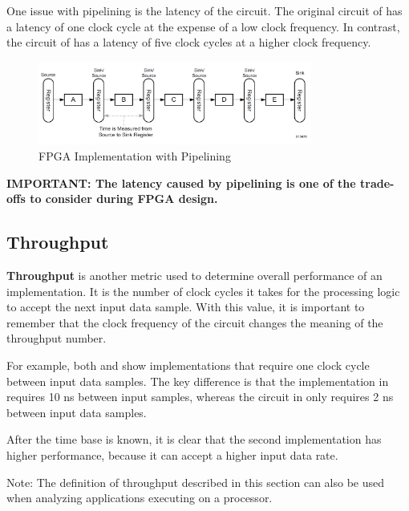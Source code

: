 One issue with pipelining is the latency of the circuit. The original circuit of  has
a latency of one clock cycle at the expense of a low clock frequency. In contrast, the circuit
of  has a latency of five clock cycles at a higher clock frequency.

\begin{figure}[H]
  \begin{center}
      \includegraphics[width=0.8\textwidth]{images/FPGAwithPipe.png}
      \caption{FPGA Implementation with Pipelining}
      \label{FPGAwithPipe}
  \end{center}
\end{figure}

\begin{highlight}
  \textbf{IMPORTANT: The latency caused by pipelining is one of the trade-offs to consider during FPGA design.}
\end{highlight}
\clearpage


\subsection{Throughput}
\textbf{Throughput} is another metric used to determine overall performance of an implementation. It is the number of clock cycles it takes for the processing logic to accept the next input data
sample. With this value, it is important to remember that the clock frequency of the circuit
changes the meaning of the throughput number. 

\par For example, both  and  show implementations that require one clock
cycle between input data samples. The key difference is that the implementation in
 requires 10 ns between input samples, whereas the circuit in  only
requires 2 ns between input data samples.

\par After the time base is known, it is clear that the
second implementation has higher performance, because it can accept a higher input data
rate.

\begin{highlight}
  Note: The definition of throughput described in this section can also be used when analyzing applications executing on a processor.
\end{highlight}

